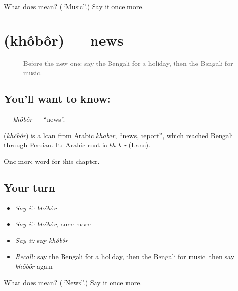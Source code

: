 \begin{tcolorbox}[breakable,colback=teal!4,colframe=teal!35!black,title={Before you move on}]
What does  mean? (\textquotedblleft{}Music\textquotedblright{}.) Say it once more.
\end{tcolorbox}
\section[\texorpdfstring{\bn{খবর} (khôbôr)}{খবর (khôbôr)}]{ (khôbôr) — news}

\label{lesson:BN-C89-khobor}



\begin{quote}
Before the new one: say the Bengali for a holiday, then the Bengali for music.
\end{quote}

\subsection*{You'll want to know: }
\textbf{} — \emph{khôbôr} — \textquotedblleft{}news\textquotedblright{}.

\begin{cousinweb}
\textbf{} (\emph{khôbôr}) is a loan from Arabic \emph{khabar}, \textquotedblleft{}news, report\textquotedblright{}, which reached Bengali through Persian. Its Arabic root is \emph{kh-b-r} (Lane).
\end{cousinweb}

\begin{grammarlens}[title={What you've built}]
One more word for this chapter.
\end{grammarlens}

\subsection*{Your turn}
\begin{itemize}
\raggedright
  \item \emph{Say it:} \emph{khôbôr}
  \item \emph{Say it:} \emph{khôbôr}, once more
  \item \emph{Say it:} say \emph{khôbôr}
  \item \emph{Recall:} say the Bengali for a holiday, then the Bengali for music, then say \emph{khôbôr} again
\end{itemize}

\begin{tcolorbox}[breakable,colback=teal!4,colframe=teal!35!black,title={Before you move on}]
What does  mean? (\textquotedblleft{}News\textquotedblright{}.) Say it once more.
\end{tcolorbox}
